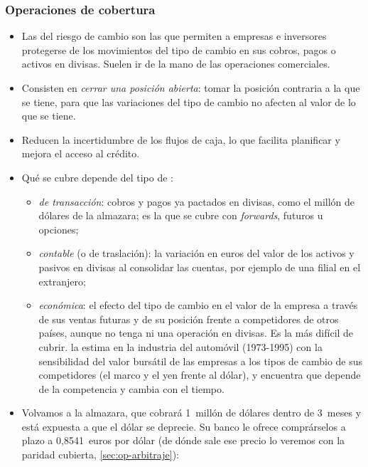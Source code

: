 \documentclass[11pt]{article}
\begin{document}
\subsubsection{Operaciones de cobertura}\label{sec:op-cobertura}

\begin{itemize}
\item Las  del riesgo de cambio son las que permiten a empresas e inversores protegerse de los movimientos del tipo de cambio en sus cobros, pagos o activos en divisas. Suelen ir de la mano de las operaciones comerciales.
\item Consisten en \emph{cerrar una posición abierta}: tomar la posición contraria a la que se tiene, para que las variaciones del tipo de cambio no afecten al valor de lo que se tiene.
\item Reducen la incertidumbre de los flujos de caja, lo que facilita planificar y mejora el acceso al crédito.
\item Qué se cubre depende del tipo de :
  \begin{itemize}
  \item \emph{de transacción}: cobros y pagos ya pactados en divisas, como el millón de dólares de la almazara; es la que se cubre con \emph{forwards}, futuros u opciones;
  \item \emph{contable} (o de traslación): la variación en euros del valor de los activos y pasivos en divisas al consolidar las cuentas, por ejemplo de una filial en el extranjero;
  \item \emph{económica}: el efecto del tipo de cambio en el valor de la empresa a través de sus ventas futuras y de su posición frente a competidores de otros países, aunque no tenga ni una operación en divisas. Es la más difícil de cubrir. \textcite{Williamson2001Exposure} la estima en la industria del automóvil (1973-1995) con la sensibilidad del valor bursátil de las empresas a los tipos de cambio de sus competidores (el marco y el yen frente al dólar), y encuentra que depende de la competencia y cambia con el tiempo.
  \end{itemize}
\item Volvamos a la almazara, que cobrará 1~millón de dólares dentro de 3~meses y está expuesta a que el dólar se deprecie. Su banco le ofrece comprárselos a plazo a 0,8541~euros por dólar (de dónde sale ese precio lo veremos con la paridad cubierta, \ref{sec:op-arbitraje}):
  \begin{itemize}

\end{itemize}
\end{itemize}
\end{document}
